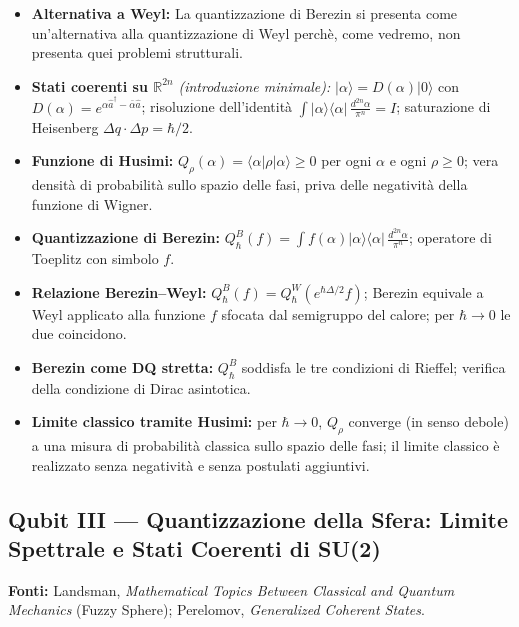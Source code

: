 \documentclass[12pt, a4paper]{article}
\newcommand{\fonti}[1]{%
	\begin{fontebox}
		\textcolor{fontecolor}{\footnotesize\textbf{Fonti:} #1}
	\end{fontebox}%
}
\begin{document}
	\begin{itemize}
		\item \textbf{Alternativa a Weyl:} La quantizzazione di Berezin si presenta come un'alternativa alla quantizzazione di Weyl perchè, come vedremo, non presenta quei problemi strutturali.
		\item \textbf{Stati coerenti su $\mathbb{R}^{2n}$} \emph{(introduzione minimale):}
		$|\alpha\rangle = D(\alpha)|0\rangle$ con $D(\alpha) = e^{\alpha \hat{a}^\dagger - \bar\alpha\hat{a}}$;
		risoluzione dell'identità $\int |\alpha\rangle\langle\alpha|\,\frac{d^{2n}\alpha}{\pi^n} = I$;
		saturazione di Heisenberg $\Delta q \cdot \Delta p = \hbar/2$.
		\item \textbf{Funzione di Husimi:} $Q_\rho(\alpha) = \langle\alpha|\rho|\alpha\rangle \geq 0$
		per ogni $\alpha$ e ogni $\rho \geq 0$; vera densità di probabilità sullo spazio
		delle fasi, priva delle negatività della funzione di Wigner.
		\item \textbf{Quantizzazione di Berezin:} $Q_\hbar^B(f) = \int f(\alpha)|\alpha\rangle
		\langle\alpha|\,\frac{d^{2n}\alpha}{\pi^n}$; operatore di Toeplitz con simbolo $f$.
		\item \textbf{Relazione Berezin--Weyl:} $Q_\hbar^B(f) = Q_\hbar^W(e^{\hbar\Delta/2}f)$;
		Berezin equivale a Weyl applicato alla funzione $f$ sfocata dal semigruppo del
		calore; per $\hbar \to 0$ le due coincidono.
		\item \textbf{Berezin come DQ stretta:} $Q_\hbar^B$ soddisfa le tre condizioni di
		Rieffel; verifica della condizione di Dirac asintotica.
		\item \textbf{Limite classico tramite Husimi:} per $\hbar \to 0$, $Q_\rho$ converge
		(in senso debole) a una misura di probabilità classica sullo spazio delle fasi;
		il limite classico è realizzato senza negatività e senza postulati aggiuntivi.
	\end{itemize}
	
	\subsection{Qubit III --- Quantizzazione della Sfera: Limite Spettrale e Stati Coerenti di SU(2)}
	
	\fonti{Landsman, \textit{Mathematical Topics Between Classical and Quantum Mechanics} (Fuzzy Sphere);
		Perelomov, \textit{Generalized Coherent States}.}
	
\end{document}
